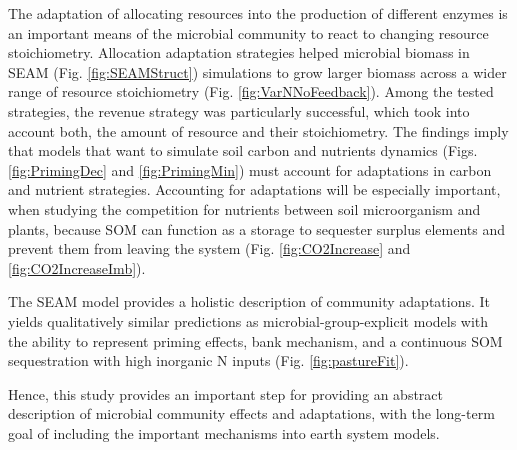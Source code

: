 \conclusions   
 
The adaptation of allocating resources into the production of different enzymes
is an important means of the microbial community to react to changing resource
stoichiometry. Allocation adaptation strategies helped microbial biomass in SEAM
(Fig. \ref{fig:SEAMStruct}) simulations to grow larger biomass across a wider
range of resource stoichiometry (Fig. \ref{fig:VarNNoFeedback}). Among the
tested strategies, the revenue strategy was particularly successful, which took
into account both, the amount of resource and their stoichiometry.
The findings imply that models that want to simulate soil carbon and nutrients
dynamics (Figs. \ref{fig:PrimingDec} and \ref{fig:PrimingMin}) must account for
adaptations in carbon and nutrient strategies. Accounting for adaptations will
be especially important, when studying the competition for nutrients between
soil microorganism and plants, because SOM can function as a storage to
sequester surplus elements and prevent them from leaving the system (Fig.
\ref{fig:CO2Increase} and \ref{fig:CO2IncreaseImb}).

The SEAM model provides a holistic description of community adaptations. It
yields qualitatively similar predictions as microbial-group-explicit models
with the ability to represent priming effects, bank mechanism, and
a continuous SOM sequestration with high inorganic N inputs (Fig.
\ref{fig:pastureFit}).

Hence, this study provides an important step for providing an abstract
description of microbial community effects and adaptations, with the long-term
goal of including the important mechanisms into earth system models.



